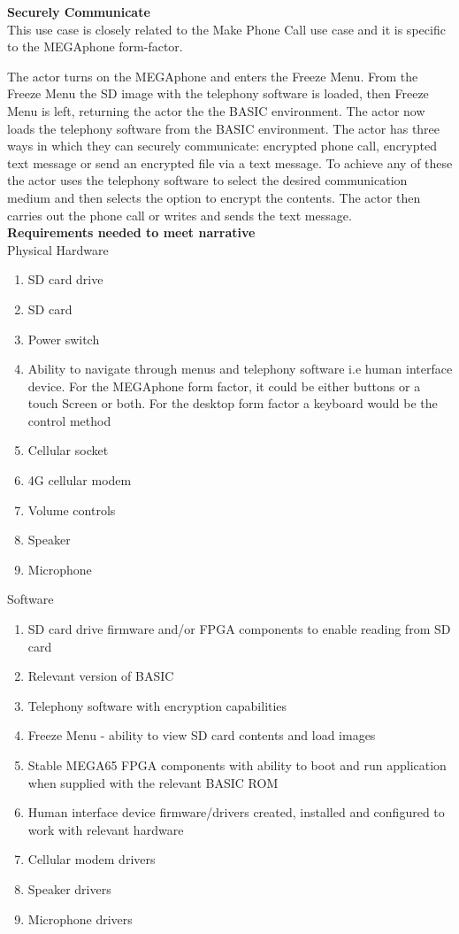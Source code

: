 \textbf{Securely Communicate}\\
This use case is closely related to the Make Phone Call use case and it is specific to the MEGAphone form-factor.

The actor turns on the MEGAphone and enters the Freeze Menu. From the Freeze Menu the SD image with the telephony software is loaded, then Freeze Menu is left, returning the actor the the BASIC environment. The actor now loads the telephony software from the BASIC environment. The actor has three ways in which they can securely communicate: encrypted phone call, encrypted text message or send an encrypted file via a text message. To achieve any of these the actor uses the telephony software to select the desired communication medium and then selects the option to encrypt the contents. The actor then carries out the phone call or writes and sends the text message. \\

\textbf{Requirements needed to meet narrative}\\
Physical Hardware
\begin{enumerate}
\item SD card drive
\item SD card
\item Power switch
\item Ability to navigate through menus and telephony software i.e human interface device. For the MEGAphone form factor, it could be either buttons or a touch Screen or both. For the desktop form factor a keyboard would be the control method
\item Cellular socket
\item 4G cellular modem
\item Volume controls
\item Speaker
\item Microphone
\end{enumerate}

Software\\
\begin{enumerate}
\item SD card drive firmware and/or FPGA components to enable reading from SD card
\item Relevant version of BASIC 
\item Telephony software with encryption capabilities
\item Freeze Menu - ability to view SD card contents and load images
\item Stable MEGA65 FPGA components with ability to boot and run application when supplied with the relevant BASIC ROM
\item Human interface device firmware/drivers created, installed and configured to work with relevant hardware
\item Cellular modem drivers
\item Speaker drivers
\item Microphone drivers
\end{enumerate}

